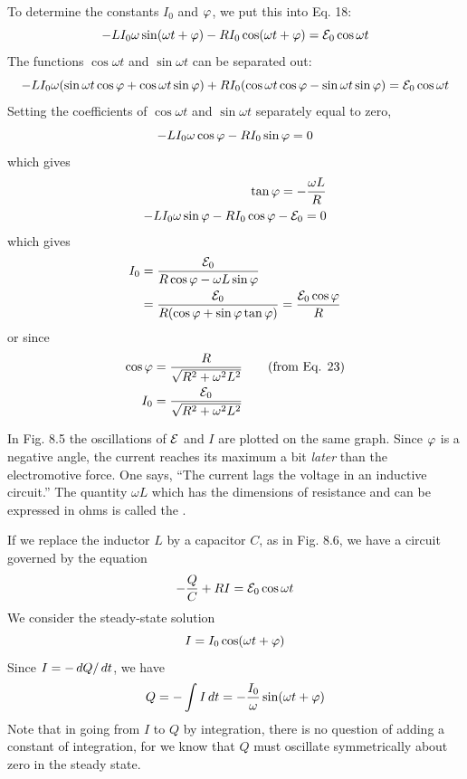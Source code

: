 To determine the constants $I_0$ and $\varphi$, we put this into Eq. 18:
\begin{equation}
  -LI_0\omega \sin (\omega t + \varphi) - RI_0 \cos (\omega t + \varphi) = \mathcal{E}_0 \cos \omega t
\end{equation}
The functions $\cos \omega t$ and $\sin \omega t$ can be separated out:
\begin{equation}
  -LI_0\omega(\sin\omega t\cos\varphi + \cos\omega t\sin\varphi)
     + RI_0(\cos\omega t\cos\varphi - \sin\omega t\sin\varphi) = \mathcal{E}_0 \cos\omega t
\end{equation}
Setting the coefficients of $\cos \omega t$ and $\sin \omega t$ separately equal to zero,
\begin{equation}
  -LI_0\omega \cos\varphi - RI_0\sin\varphi = 0
\end{equation}
which gives
\begin{align}
  \tan\varphi = -\frac{\omega L}{R}& \\
  -LI_0\omega \sin\varphi - RI_0\cos\varphi - \mathcal{E}_0 = 0
\end{align}
which gives
\begin{align}
\begin{split}
  I_0 &= \frac{\mathcal{E}_0}{R\cos\varphi-\omega L\sin\varphi} \\
      &= \frac{\mathcal{E}_0}{R(\cos\varphi+\sin\varphi\tan\varphi)} = \frac{\mathcal{E}_0\cos\varphi}{R}
\end{split}  
\end{align}
or since
\begin{align}
  \cos\varphi &= \frac{R}{\sqrt{R^2+\omega^2L^2}}   \qquad (\text{from Eq. 23}) \\
  I_0 &= \frac{\mathcal{E}_0}{\sqrt{R^2+\omega^2L^2}}
\end{align}

In Fig. 8.5 the oscillations of $\mathcal{E}$ and $I$ are plotted on the same graph.
Since $\varphi$ is a negative angle, the current reaches its maximum a bit
\emph{later} than the electromotive force. One says, ``The current lags the
voltage in an inductive circuit.'' The quantity $\omega L$ which has the
dimensions of resistance and can be expressed in ohms is called the
.

If we replace the inductor $L$ by a capacitor $C$, as in Fig. 8.6, we
have a circuit governed by the equation
\begin{equation}
  -\frac{Q}{C} + RI = \mathcal{E}_0\cos\omega t
\end{equation}
We consider the steady-state solution
\begin{equation}
  I = I_0 \cos (\omega t + \varphi)
\end{equation}
Since $I=-\mathop{d\!} Q/\mathop{d\!} t$, we have
\begin{equation}
  Q = -\int I\mathop{d\!} t = -\frac{I_0}{\omega}\sin(\omega t+\varphi)
\end{equation}
Note that in going from $I$ to $Q$ by integration, there is no question
of adding a constant of integration, for we know that $Q$ must oscillate
symmetrically about zero in the steady state.

